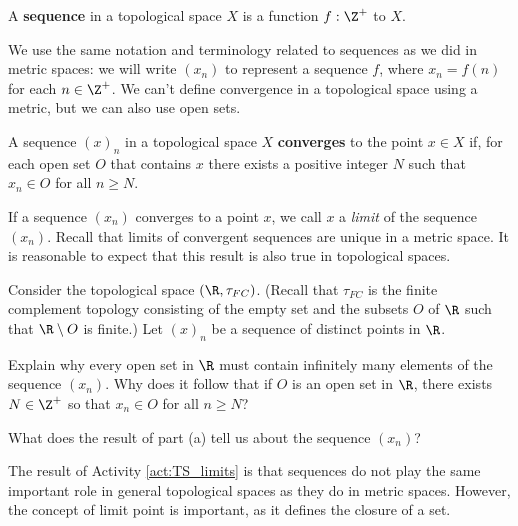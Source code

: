 \begin{definition} A \textbf{sequence} in a topological space $X$ is a function $f: \Z^+$ to $X$.
\end{definition}



We use the same notation and terminology related to sequences as we did in metric spaces: we will write $(x_n)$ to represent a sequence $f$, where $x_n = f(n)$ for each $ n \in \Z^+$. We can't define convergence in a topological space using a metric, but we can also use open sets. 



\begin{definition} A sequence $(x)_n$ in a topological space $X$ \textbf{converges} to the point $x \in X$ if, for each open set $O$ that contains $x$ there exists a positive integer $N$ such that $x_n \in O$ for all $n \geq N$. 
\end{definition}



If a sequence $(x_n)$ converges to a point $x$, we call $x$ a \emph{limit} of the sequence $(x_n)$. Recall that limits of convergent sequences are unique in a metric space. It is reasonable to expect that this result is also true in topological spaces. 



\begin{activity} \label{act:TS_limits} Consider the topological space $(\R, \tau_{FC})$. (Recall that $\tau_{FC}$ is the finite complement topology consisting of the empty set and the subsets $O$ of $\R$ such that $\R \setminus O$ is finite.) Let $(x)_n$ be a sequence of distinct points in $\R$. 
	\ba
	\item Explain why every open set in $\R$ must contain infinitely many elements of the sequence $(x_n)$. Why does it follow that if $O$ is an open set in $\R$, there exists $N \in \Z^+$ so that $x_n \in O$ for all $n \geq N$?



	\item What does the result of part (a) tell us about the sequence $(x_n)$? 



	\ea
	
	
%	
	
	
%	
	

\end{activity}


The result of Activity \ref{act:TS_limits} is that sequences do not play the same important role in general topological spaces as they do in metric spaces. However, the concept of limit point is important, as it defines the closure of a set. 
